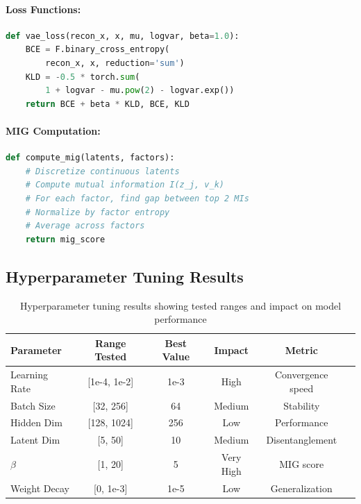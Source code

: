 \documentclass[conference]{IEEEtran}
\begin{document}
\paragraph{Loss Functions:}
\begin{lstlisting}[language=Python, basicstyle=\small\ttfamily]
def vae_loss(recon_x, x, mu, logvar, beta=1.0):
    BCE = F.binary_cross_entropy(
        recon_x, x, reduction='sum')
    KLD = -0.5 * torch.sum(
        1 + logvar - mu.pow(2) - logvar.exp())
    return BCE + beta * KLD, BCE, KLD
\end{lstlisting}

\paragraph{MIG Computation:}
\begin{lstlisting}[language=Python, basicstyle=\small\ttfamily]
def compute_mig(latents, factors):
    # Discretize continuous latents
    # Compute mutual information I(z_j, v_k)
    # For each factor, find gap between top 2 MIs
    # Normalize by factor entropy
    # Average across factors
    return mig_score
\end{lstlisting}

\subsection{Hyperparameter Tuning Results}

\begin{table}[H]
\centering
\small
\begin{tabular}{@{}lccccc@{}}
\toprule
\textbf{Parameter} & \textbf{Range Tested} & \textbf{Best Value} & \textbf{Impact} & \textbf{Metric} \\ \midrule
Learning Rate & [1e-4, 1e-2] & 1e-3 & High & Convergence speed \\
Batch Size & [32, 256] & 64 & Medium & Stability \\
Hidden Dim & [128, 1024] & 256 & Low & Performance \\
Latent Dim & [5, 50] & 10 & Medium & Disentanglement \\
$\beta$ & [1, 20] & 5 & Very High & MIG score \\
Weight Decay & [0, 1e-3] & 1e-5 & Low & Generalization \\ \bottomrule
\end{tabular}
\caption{Hyperparameter tuning results showing tested ranges and impact on model performance}
\label{tab:hyperparameter_tuning}
\end{table}
\end{document}
